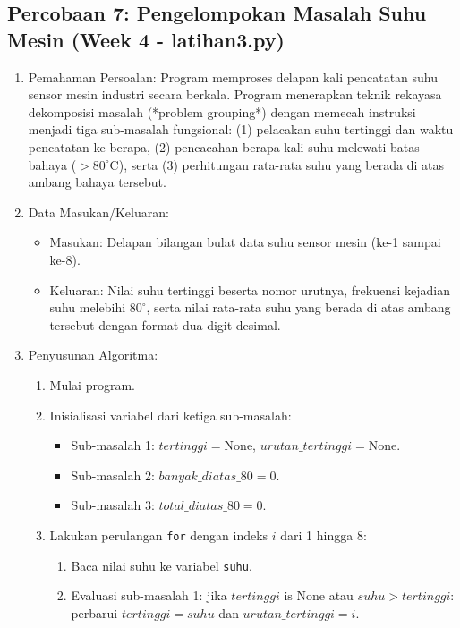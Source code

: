 \documentclass[12pt,a4paper]{article}
\begin{document}
\subsection{Percobaan 7: Pengelompokan Masalah Suhu Mesin (Week 4 - latihan3.py)}
\begin{enumerate}
    \item Pemahaman Persoalan: Program memproses delapan kali pencatatan suhu sensor mesin industri secara berkala. Program menerapkan teknik rekayasa dekomposisi masalah (*problem grouping*) dengan memecah instruksi menjadi tiga sub-masalah fungsional: (1) pelacakan suhu tertinggi dan waktu pencatatan ke berapa, (2) pencacahan berapa kali suhu melewati batas bahaya ($> 80^\circ\text{C}$), serta (3) perhitungan rata-rata suhu yang berada di atas ambang bahaya tersebut.
    \item Data Masukan/Keluaran:
    \begin{itemize}
        \item Masukan: Delapan bilangan bulat data suhu sensor mesin (ke-1 sampai ke-8).
        \item Keluaran: Nilai suhu tertinggi beserta nomor urutnya, frekuensi kejadian suhu melebihi $80^\circ$, serta nilai rata-rata suhu yang berada di atas ambang tersebut dengan format dua digit desimal.
    \end{itemize}
    \item Penyusunan Algoritma:
    \begin{enumerate}[label=\alph*.]
        \item Mulai program.
        \item Inisialisasi variabel dari ketiga sub-masalah:
        \begin{itemize}
            \item Sub-masalah 1: $tertinggi = \text{None}$, $urutan\_tertinggi = \text{None}$.
            \item Sub-masalah 2: $banyak\_diatas\_80 = 0$.
            \item Sub-masalah 3: $total\_diatas\_80 = 0$.
        \end{itemize}
        \item Lakukan perulangan \texttt{for} dengan indeks $i$ dari 1 hingga 8:
        \begin{enumerate}[label=\roman*.]
            \item Baca nilai suhu ke variabel \texttt{suhu}.
            \item Evaluasi sub-masalah 1: jika $tertinggi \text{ is None}$ atau $suhu > tertinggi$: perbarui $tertinggi = suhu$ dan $urutan\_tertinggi = i$.

\end{enumerate}
\end{enumerate}
\end{enumerate}
\end{document}
